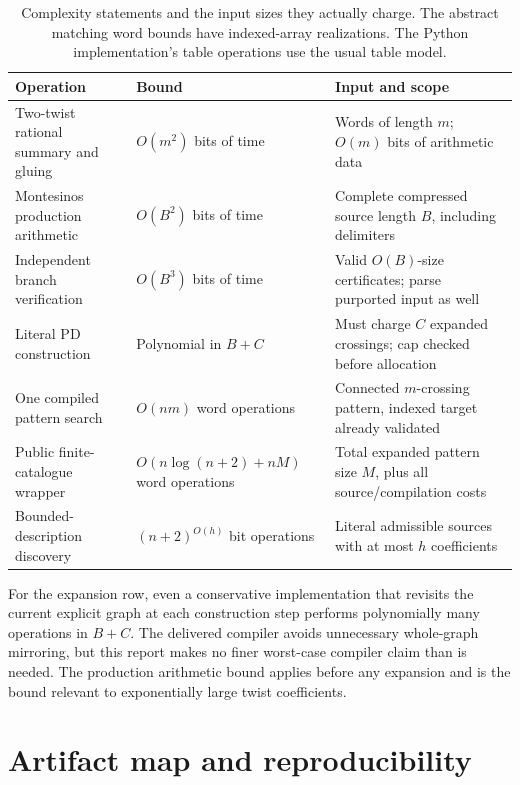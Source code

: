 \begin{table}[htbp]
\centering\small
\begin{tabularx}{\textwidth}{L{0.30\textwidth}L{0.25\textwidth}X}
\toprule
Operation & Bound & Input and scope\\
\midrule
Two-twist rational summary and gluing &
\(O(m^2)\) bits of time &
Words of length \(m\); \(O(m)\) bits of arithmetic data\\
\addlinespace
Montesinos production arithmetic &
\(O(B^2)\) bits of time &
Complete compressed source length \(B\), including delimiters\\
\addlinespace
Independent branch verification &
\(O(B^3)\) bits of time &
Valid \(O(B)\)-size certificates; parse purported input as well\\
\addlinespace
Literal PD construction &
Polynomial in \(B+C\) &
Must charge \(C\) expanded crossings; cap checked before allocation\\
\addlinespace
One compiled pattern search &
\(O(nm)\) word operations &
Connected \(m\)-crossing pattern, indexed target already validated\\
\addlinespace
Public finite-catalogue wrapper &
\(O(n\log(n+2)+nM)\) word operations &
Total expanded pattern size \(M\), plus all source/compilation costs\\
\addlinespace
Bounded-description discovery &
\((n+2)^{O(h)}\) bit operations &
Literal admissible sources with at most \(h\) coefficients\\
\bottomrule
\end{tabularx}
\caption{Complexity statements and the input sizes they actually charge.
The abstract matching word bounds have indexed-array realizations.
The Python implementation's table operations use the usual table model.}
\label{tab:complexity}
\end{table}

For the expansion row, even a conservative implementation that revisits
the current explicit graph at each construction step performs polynomially
many operations in \(B+C\). The delivered compiler avoids unnecessary
whole-graph mirroring, but this report makes no finer worst-case compiler
claim than is needed. The production arithmetic bound applies before
any expansion and is the bound relevant to exponentially large twist
coefficients.

\section{Artifact map and reproducibility}

